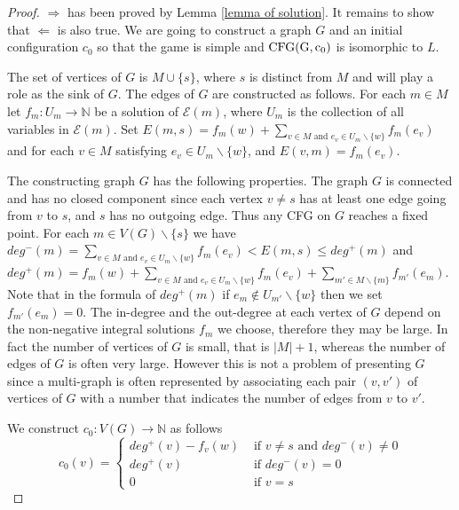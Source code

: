 \documentclass{article}
\theoremstyle{definition}
\newcommand\set[1]{\{ #1 \}}
\begin{document}
\begin{proof}
$\Rightarrow$ has been proved by Lemma \ref{lemma of solution}. It remains to show that $\Leftarrow$ is also true. We are going to construct a graph $G$ and an initial configuration $c_0$ so that the game is simple and ${\rm CFG(G,c_0)}$ is isomorphic to $L$.

The set of vertices of $G$ is $M\cup \set{s}$, where $s$ is distinct from $M$ and will play a role as the sink of $G$. The edges of $G$ are constructed as follows. For each $m\in M$ let $f_m:U_m\to \mathbb{N}$ be a solution of $\mathcal{E}(m)$, where $U_m$ is the collection of all variables in $\mathcal{E}(m)$. Set $E(m,s)=f_m (w)+\underset{v \in M \text{ and }e_v\in U_m \backslash \set{w}}{\sum} f_m (e_v)$ and for each $v\in M$ satisfying $e_v \in U_m\backslash \set{w}$, and $E(v,m)=f_m(e_v)$.

The constructing graph $G$ has the following properties. The graph $G$ is connected and has no closed component since each vertex $v\neq s$ has at least one edge going from $v$ to $s$, and $s$ has no outgoing edge. Thus any CFG on $G$ reaches a fixed point. For each $m \in V(G)\backslash \set{s}$ we have $deg^{-}(m)=\underset{v \in M\text{ and } e_v\in U_m\backslash\set{w}}{\sum}f_m(e_v)<E(m,s)\leq deg^{+}(m)$ and $deg^{+}(m)=f_m(w)+\underset{v \in M\text{ and } e_v \in U_m\backslash\set{w}}{\sum}f_m(e_v)+\underset{m'\in M\backslash \set{m}}{\sum} f_{m'}(e_m)$. Note that in the formula of $deg^{+}(m)$ if $e_m \not \in U_{m'}\backslash \set{w}$ then we set $f_{m'}(e_m)=0$. The in-degree and the out-degree at each  vertex of $G$ depend on the non-negative integral solutions $f_m$ we choose, therefore they may be large. In fact the number of vertices of $G$ is small, that is $|M|+1$, whereas the number of edges of $G$ is often very large. However this is not a problem of presenting $G$ since a multi-graph is often represented by associating each pair $(v,v')$ of vertices of $G$ with a number that indicates the number of edges from $v$ to $v'$.

We construct $c_0:V(G)\to\mathbb{N}$ as follows
$$
 c_0(v)=\begin{cases}
deg^{+}(v)-f_v(w)&\text{ if } v \neq s \text{ and } deg^{-}(v)\neq 0\\
deg^{+}(v)&\text{ if }deg^{-}(v)=0\\
0& \text{ if } v=s
\end{cases}
$$


\end{proof}
\end{document}
